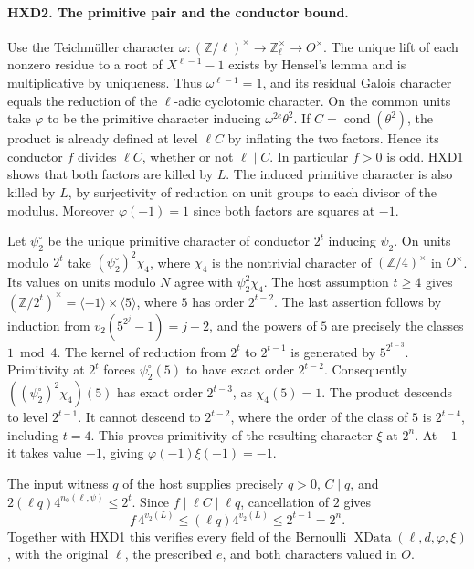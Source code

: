 \paragraph{HXD2. The primitive pair and the conductor bound.}
Use the Teichm\"uller character $\omega:(\mathbb Z/\ell)^\times
\to\mathbb Z_\ell^\times\to O^\times$. The unique lift of each
nonzero residue to a root of $X^{\ell-1}-1$ exists by Hensel's
lemma and is multiplicative by uniqueness. Thus $\omega^{\ell-1}=1$,
and its residual Galois character equals the reduction of the
$\ell$-adic cyclotomic character. On the common units take
$\varphi$ to be the primitive character inducing
$\omega^{2e}\theta^2$. If $C=\operatorname{cond}(\theta^2)$,
the product is already defined at level $\ell C$ by inflating
the two factors. Hence its conductor $f$ divides $\ell C$,
whether or not $\ell\mid C$. In particular $f>0$ is odd.
HXD1 shows that both factors are killed by $L$. The induced primitive
character is also killed by $L$, by surjectivity of reduction on unit
groups to each divisor of the modulus. Moreover $\varphi(-1)=1$
since both factors are squares at $-1$.

Let $\psi_2^\circ$ be the unique primitive character of conductor
$2^t$ inducing $\psi_2$. On units modulo $2^t$ take
$(\psi_2^\circ)^2\chi_4$, where $\chi_4$ is the nontrivial
character of $(\mathbb Z/4)^\times$ in $O^\times$. Its values on
units modulo $N$ agree with $\psi_2^2\chi_4$.
The host assumption $t\ge4$ gives
$(\mathbb Z/2^t)^\times=\langle-1\rangle\times\langle5\rangle$,
where $5$ has order $2^{t-2}$. The last assertion follows by
induction from $v_2(5^{2^j}-1)=j+2$, and the powers of $5$ are
precisely the classes $1\bmod4$. The kernel of reduction from
$2^t$ to $2^{t-1}$ is generated by $5^{2^{t-3}}$. Primitivity
at $2^t$ forces $\psi_2^\circ(5)$ to have exact order $2^{t-2}$.
Consequently $((\psi_2^\circ)^2\chi_4)(5)$ has exact order $2^{t-3}$,
as $\chi_4(5)=1$. The product descends to level $2^{t-1}$.
It cannot descend to $2^{t-2}$, where the order of the
class of $5$ is $2^{t-4}$, including $t=4$. This proves primitivity
of the resulting character $\xi$ at $2^n$. At $-1$ it takes value $-1$, giving
$\varphi(-1)\xi(-1)=-1$.

The input witness $q$ of the host supplies precisely $q>0$, $C\mid q$,
and $2(\ell q)4^{n_0(\ell,\psi)}\le 2^t$.
Since $f\mid\ell C\mid\ell q$, cancellation of $2$ gives
\[
       f\,4^{v_2(L)}\le(\ell q)4^{v_2(L)}\le2^{t-1}=2^n .
\]
Together with HXD1 this verifies every field of the Bernoulli
$\operatorname{XData}(\ell,d,\varphi,\xi)$, with the original
$\ell$, the prescribed $e$, and both characters valued in $O$.

